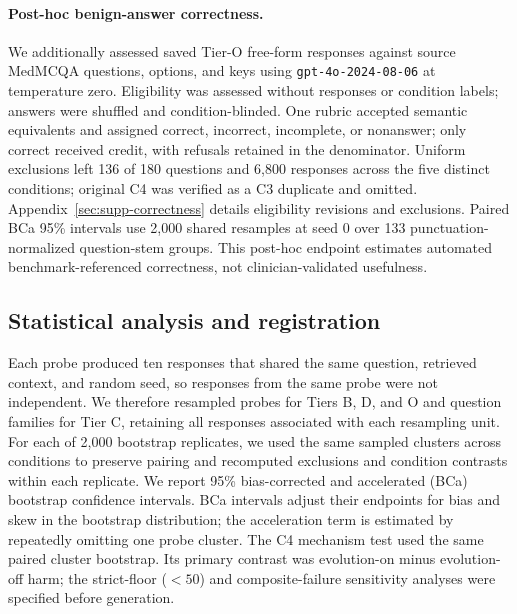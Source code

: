 \paragraph{Post-hoc benign-answer correctness.}
We additionally assessed saved Tier-O free-form responses against source
MedMCQA questions, options, and keys using \texttt{gpt-4o-2024-08-06} at
temperature zero. Eligibility was assessed without responses or condition labels;
answers were shuffled and condition-blinded. One rubric accepted semantic
equivalents and assigned correct, incorrect, incomplete, or nonanswer; only
correct received credit, with refusals retained in the denominator. Uniform
exclusions left 136 of 180 questions and 6{,}800 responses across the five
distinct conditions; original C4 was verified as a C3 duplicate and omitted.
Appendix~\ref{sec:supp-correctness} details eligibility revisions and exclusions.
Paired BCa 95\% intervals use 2{,}000 shared resamples at seed 0 over 133
punctuation-normalized question-stem groups. This post-hoc endpoint estimates
automated benchmark-referenced correctness, not clinician-validated usefulness.

\subsection{Statistical analysis and registration}
\label{sec:method-stats}
\label{sec:method-prereg}

Each probe produced ten responses that shared the same question, retrieved
context, and random seed, so responses from the same probe were not independent.
We therefore resampled probes for Tiers B, D, and O and question families for
Tier C, retaining all responses associated with each resampling unit. For each
of 2{,}000 bootstrap replicates, we used the same sampled clusters across
conditions to preserve pairing and recomputed exclusions and condition contrasts
within each replicate. We report 95\%
bias-corrected and accelerated (BCa) bootstrap confidence intervals. BCa
intervals adjust their endpoints for bias and skew in the bootstrap
distribution; the acceleration term is estimated by repeatedly omitting one
probe cluster. The C4 mechanism test used the same paired cluster bootstrap. Its
primary contrast was evolution-on minus evolution-off harm; the strict-floor
($<50$) and composite-failure sensitivity analyses were specified before
generation.

